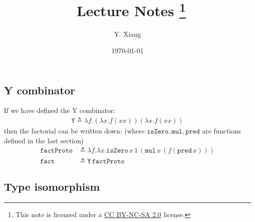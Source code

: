 \documentclass{article}
\title{\vspace{-3em}\course\, Lecture Notes \asnum\footnote{This note is licensed under a \href{https://creativecommons.org/licenses/by-nc-sa/2.0/}{CC BY-NC-SA 2.0} license.}}
\author{Y. Xiang\vspace{1em}}
\date{\today\vspace{-1em}}
\theoremstyle{definition}
\begin{document}
\maketitle

\subsection{Y combinator}
If we have defined the Y combinator:
\begin{align}
    \mathtt{Y} \triangleq \lambda f.(\lambda x.f (x x)) (\lambda x.f (x x))
\end{align}
then the factorial can be written down: (where $\mathtt{isZero},\mathtt{mul}, \mathtt{pred}$ are functions defined in the last section)
\begin{align}
    \mathtt{factProto} & \triangleq \lambda f.\lambda x.\mathtt{isZero}\, x\, 1\, (\mathtt{mul}\, x\, (f (\mathtt{pred}\, x))) \\
    \mathtt{fact}      & \triangleq \mathtt{Y}\, \mathtt{factProto}
\end{align}

\subsection{Type isomorphism}
\end{document}
